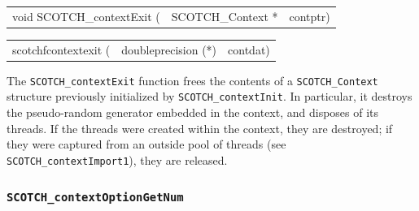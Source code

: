 \begin{itemize}
\progsyn

{\tt\begin{tabular}{l@{}ll}
void SCOTCH\_contextExit ( & SCOTCH\_Context * & contptr)
\end{tabular}}

{\tt\begin{tabular}{l@{}ll}
scotchfcontextexit ( & doubleprecision (*) & contdat)
\end{tabular}}

\progdes

The \texttt{SCOTCH\_contextExit} function frees the contents of a
\texttt{SCOTCH\_\lbt Context} structure previously initialized by
\texttt{SCOTCH\_\lbt contextInit}. In particular, it destroys the
pseudo-random generator embedded in the context, and disposes of its
threads. If the threads were created within the context, they are
destroyed; if they were captured from an outside pool of threads (see
\texttt{SCOTCH\_\lbt context\lbt Import1}), they are released.
\end{itemize}

\subsubsection{\texttt{SCOTCH\_contextOptionGetNum}}
\label{sec-lib-context-option-get-num}

